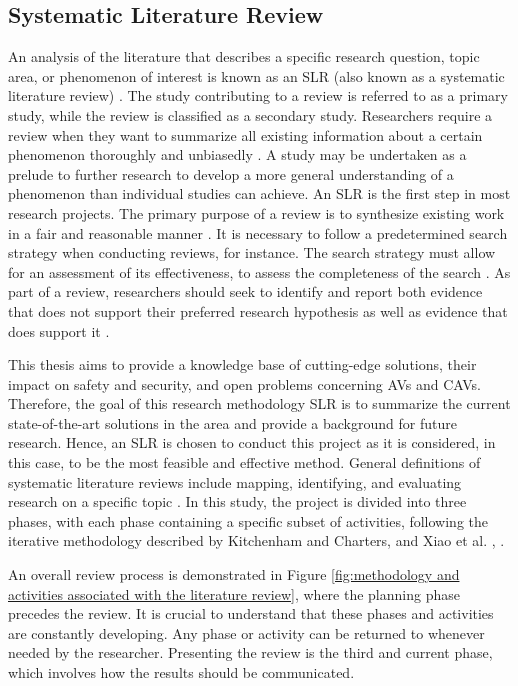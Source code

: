 \documentclass[a4paper,12pt]{article}
\begin{document}
\subsection{Systematic Literature Review}
\label{sec:literature_review}
\hspace{5mm} An analysis of the literature that describes a specific research question, topic area, or phenomenon of interest is known as an SLR (also known as a systematic literature review) \cite{article10}. The study contributing to a review is referred to as a primary study, while the review is classified as a secondary study. Researchers require a review when they want to summarize all existing information about a certain phenomenon thoroughly and unbiasedly \cite{article10}. A study may be undertaken as a prelude to further research to develop a more general understanding of a phenomenon than individual studies can achieve. An SLR is the first step in most research projects. The primary purpose of a review is to synthesize existing work in a fair and reasonable manner \cite{article10}. It is necessary to follow a predetermined search strategy when conducting reviews, for instance. The search strategy must allow for an assessment of its effectiveness, to assess the completeness of the search \cite{article10}. As part of a review, researchers should seek to identify and report both evidence that does not support their preferred research hypothesis as well as evidence that does support it \cite{article10}.\par

This thesis aims to provide a knowledge base of cutting-edge solutions, their impact on safety and security, and open problems concerning AVs and CAVs. Therefore, the goal of this research methodology SLR is to summarize the current state-of-the-art solutions in the area and provide a background for future research. Hence, an SLR is chosen to conduct this project as it is considered, in this case, to be the most feasible and effective method. General definitions of systematic literature reviews include mapping, identifying, and evaluating research on a specific topic \cite{article10}. In this study, the project is divided into three phases, with each phase containing a specific subset of activities, following the iterative methodology described by Kitchenham and Charters, and Xiao et al. \cite{article10}, \cite{article11}.

An overall review process is demonstrated in Figure \ref{fig:methodology and activities associated with the literature review}, where the planning phase precedes the review. It is crucial to understand that these phases and activities are constantly developing. Any phase or activity can be returned to whenever needed by the researcher. Presenting the review is the third and current phase, which involves how the results should be communicated.
\end{document}
